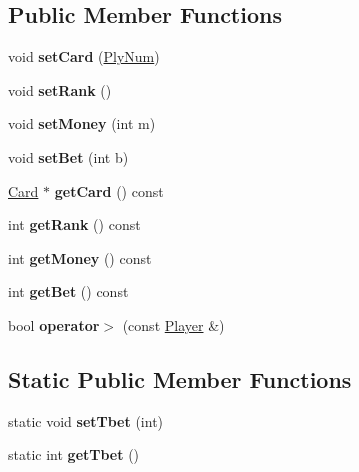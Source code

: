 \subsection*{Public Member Functions}
\begin{DoxyCompactItemize}
\item 
\hypertarget{class_player_a590858bfa3e172bee3c7c3a00168683a}{}\label{class_player_a590858bfa3e172bee3c7c3a00168683a} 
void {\bfseries set\+Card} (\hyperlink{struct_ply_num}{Ply\+Num})
\item 
\hypertarget{class_player_a384903af63898cdfb4e0bface7a65d6e}{}\label{class_player_a384903af63898cdfb4e0bface7a65d6e} 
void {\bfseries set\+Rank} ()
\item 
\hypertarget{class_player_aac509fade64f5bfbf6014ea3c2e3e5ea}{}\label{class_player_aac509fade64f5bfbf6014ea3c2e3e5ea} 
void {\bfseries set\+Money} (int m)
\item 
\hypertarget{class_player_a7a4239edef8f2ae2d88e4691819997d9}{}\label{class_player_a7a4239edef8f2ae2d88e4691819997d9} 
void {\bfseries set\+Bet} (int b)
\item 
\hypertarget{class_player_a6944db2ca2b4fd6736ef57be8b4abc05}{}\label{class_player_a6944db2ca2b4fd6736ef57be8b4abc05} 
\hyperlink{class_card}{Card} $\ast$ {\bfseries get\+Card} () const
\item 
\hypertarget{class_player_a903c68ffc821cba6e813a4d3b0b4c770}{}\label{class_player_a903c68ffc821cba6e813a4d3b0b4c770} 
int {\bfseries get\+Rank} () const
\item 
\hypertarget{class_player_aed6ceb1d2d434747fbea5a7fc9f829e4}{}\label{class_player_aed6ceb1d2d434747fbea5a7fc9f829e4} 
int {\bfseries get\+Money} () const
\item 
\hypertarget{class_player_af72bd8540101dd0f76c4a00c6b3a7982}{}\label{class_player_af72bd8540101dd0f76c4a00c6b3a7982} 
int {\bfseries get\+Bet} () const
\item 
\hypertarget{class_player_ada245979b1652b1d7795269cf73c1a6b}{}\label{class_player_ada245979b1652b1d7795269cf73c1a6b} 
bool {\bfseries operator$>$} (const \hyperlink{class_player}{Player} \&)
\end{DoxyCompactItemize}
\subsection*{Static Public Member Functions}
\begin{DoxyCompactItemize}
\item 
\hypertarget{class_player_ad60125d6e71ec216c68708e1460a2acb}{}\label{class_player_ad60125d6e71ec216c68708e1460a2acb} 
static void {\bfseries set\+Tbet} (int)
\item 
\hypertarget{class_player_ae04b689fe6a30486d457524fdee04643}{}\label{class_player_ae04b689fe6a30486d457524fdee04643} 
static int {\bfseries get\+Tbet} ()
\end{DoxyCompactItemize}
